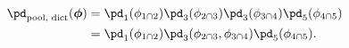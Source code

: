 \begin{equation}
  \begin{aligned}
    \pd_{\text{pool, dict}}(\boldsymbol{\phi})
    &= \pd_{1}(\phi_{1 \cap 2})
      \pd_{3}(\phi_{2 \cap 3})
      \pd_{3}(\phi_{3 \cap 4})
      \pd_{5}(\phi_{4 \cap 5}) \\
    &= \pd_{1}(\phi_{1 \cap 2})
      \pd_{3}(\phi_{2 \cap 3}, \phi_{3 \cap 4})
      \pd_{5}(\phi_{4 \cap 5}).
  \end{aligned}
  \label{eqn:dictatorial-def-two-example-one}
\end{equation}